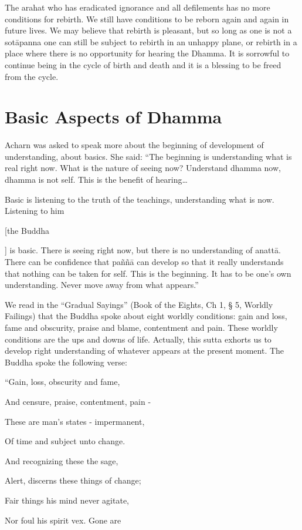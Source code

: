 {{{{{{{The arahat who has eradicated ignorance
and all defilements has no more conditions for rebirth. We still have
conditions to be reborn again and again in future lives. We may believe
that rebirth is pleasant, but so long as one is not a sotāpanna one can
still be subject to rebirth in an unhappy plane, or rebirth in a place
where there is no opportunity for hearing the Dhamma. It is sorrowful to
continue being in the cycle of birth and death and it is a blessing to
be freed from the cycle. 



\chapter{Basic Aspects of Dhamma}

Acharn was asked to speak more about
the beginning of development of understanding, about basics. She said:
``The beginning is understanding what is real right now. What is the
nature of seeing now? Understand dhamma now, dhamma is not self. This is
the benefit of hearing\ldots{ Basic is listening to the truth of the
teachings, understanding what is now. Listening to him {[the Buddha{]
is basic. There is seeing right now, but there is no understanding of
anattā. There can be confidence that paññā can develop so that it really
understands that nothing can be taken for self. This is the beginning.
It has to be one's own understanding. Never move away from what
appears.''

We read in the ``Gradual Sayings''
(Book of the Eights, Ch 1, § 5, Worldly Failings) that the Buddha spoke
about eight worldly conditions: gain and loss, fame and obscurity,
praise and blame, contentment and pain. These worldly conditions are the
ups and downs of life. Actually, this sutta exhorts us to develop right
understanding of whatever appears at the present moment. The Buddha
spoke the following verse:

``Gain, loss, obscurity and fame,

And censure, praise, contentment, pain
-

These are man's states - impermanent,

Of time and subject unto change.

And recognizing these the sage,

Alert, discerns these things of change;

Fair things his mind never agitate,

Nor foul his spirit vex. Gone are

}}}}}}}}}}
